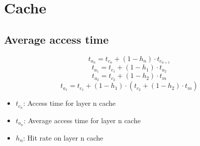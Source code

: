 \section{Cache}
\subsection{Average access time}
\[ t_{a_n} = t_{c_n} + (1 - h_n) \cdot t_{c_{n+1}} \]
\[ t_{a_1} = t_{c_1} + (1 - h_1) \cdot t_{a_2} \]
\[ t_{a_2} = t_{c_2} + (1 - h_2) \cdot t_m \]
\[ t_{a_1} = t_{c_1} + (1 - h_1) \cdot (t_{c_2} + (1 - h_2) \cdot t_m) \]
\begin{itemize}
    \item[] $t_{c_n}$: Access time for layer n cache
    \item[] $t_{a_n}$: Average access time for layer n cache
    \item[] $h_n$: Hit rate on layer n cache
\end{itemize}
